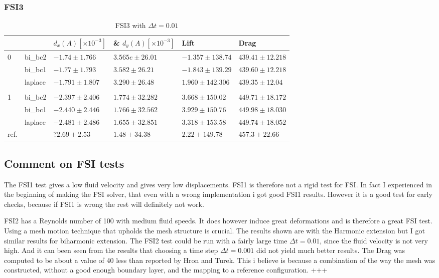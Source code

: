 \subsubsection*{FSI3}
\begin{table}[H]
\centering
\caption{FSI3 with $\Delta t = 0.01$}
\label{my-label}
\begin{tabular}{|l|l|l|l|l|l|}
\hline
 &  & $d_x(A) [\times10^{-3}]$ & \& $d_y(A)[\times10^{-3}]$ & Lift & Drag \\ \hline
0 & bi\_bc2 & $-1.74 \pm 1.766$ & $ 3.565e \pm 26.01 $ & $ -1.357 \pm 138.74$ & $439.41 \pm12.218$ \\ \hline
 & bi\_bc1 & $-1.77 \pm 1.793$ & $ 3.582 \pm 26.21 $ & $ -1.843 \pm 139.29$ & $439.60\pm12.218$ \\ \hline
 & laplace & $-1.791 \pm 1.807$ & $ 3.290 \pm 26.48 $ & $1.960 \pm 142.306$ & $ 439.35 \pm 12.04$ \\ \hline
 &  &  &  &  &  \\ \hline
1 & bi\_bc2 & $-2.397 \pm 2.406$ & $ 1.774 \pm 32.282 $ & $ 3.668 \pm 150.02$ & $ 449.71 \pm 18.172$ \\ \hline
 & bi\_bc1 & $ -2.440 \pm 2.446$ & $ 1.766 \pm 32.562 $ & $ 3.929 \pm 150.76$ & $ 449.98 \pm 18.030$ \\ \hline
 & laplace & $ -2.481 \pm 2.486$ & $ 1.655 \pm 32.851$ & $ 3.318 \pm 153.58$ & $ 449.74 \pm18.052$ \\ \hline
ref. &  & $ ?2.69 \pm 2.53$ & $1.48 \pm 34.38 $ & $ 2.22 \pm 149.78$ & $ 457.3 \pm 22.66$ \\ \hline
\end{tabular}
\end{table}

\subsection*{Comment on FSI tests}
The FSI1 test gives a low fluid velocity and gives very low displacements. FSI1 is therefore not a rigid test for FSI. In fact I experienced in the beginning of making the FSI solver, that even with a wrong implementation i got good FSI1 results. However it is a good test for early checks, because if FSI1 is wrong the rest will definitely not work.  \newline

FSI2 has a Reynolds number of 100 with medium fluid speeds. It does however induce great deformations and is therefore a great FSI test. Using a mesh motion technique that upholds the mesh structure is crucial. The results shown are with the Harmonic extension but I got similar results for biharmonic extension. The FSI2 test could be run with a fairly large time $\Delta t = 0.01 $, since the fluid velocity is not very high. And it can been seen from the results that choosing a time step $\Delta t = 0.001$ did not yield much better results. The Drag was computed to be about a value of 40 less than reported by Hron and Turek. This i believe is because a combination of the way the mesh was constructed, without a good enough boundary layer, and the mapping to a reference configuration. +++ \newline

